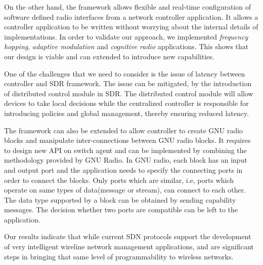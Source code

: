 On the other hand, the \crossflow framework allows flexible and real-time configuration of software defined radio interfaces from a network controller application. It allows a controller application to be written without worrying about the internal details of implementations. In order to validate our approach, we implemented \emph{frequency hopping}, \emph{adaptive modulation} and \emph{cognitive radio} applications. This shows that our design is viable and can extended to introduce new capabilities.

One of the challenges that we need to consider is the issue of latency between controller and SDR framework. The issue can be mitigated, by the introduction of distributed control module in SDR. The distributed control module will allow devices to take local decisions while the centralized controller is responsible for introducing policies and global management, thereby ensuring reduced latency.

The \crossflow framework can also be extended to allow controller to create GNU radio blocks and manipulate inter-connections between GNU radio blocks. It requires to design new API on switch agent and can be implemented by combining the methodology provided by GNU Radio. In GNU radio, each block has an input and output port and the application needs to specify the connecting ports in order to connect the blocks. Only ports which are similar, i.e, ports which operate on same types of data(message or stream), can connect to each other. The data type supported by a block can be obtained by sending capability messages. The decision whether two ports are compatible can be left to the application. 

Our results indicate that while current SDN protocols support the
development of very intelligent wireline network management applications, \aetherflow and \crossflow are
significant steps in bringing that same level of programmability to wireless
networks.
